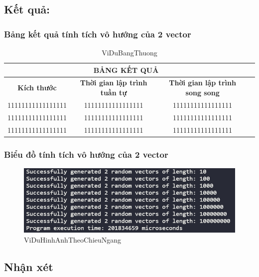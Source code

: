 \newpage
\subsection{Kết quả:}
\subsubsection{Bảng kết quả tính tích vô hướng của 2 vector}


 
 \begin{table}[h] %
 \centering
 \begin{tabular}{|c|c|c|c|}

 \hline
 \multicolumn{3}{|c|}{\textbf{BẢNG KẾT QUẢ}} \\ 
 \hline
 \textbf{Kích thước} & \textbf{Thời gian lập trình tuần tự} & \textbf{Thời gian lập trình song song} \\ \hline
 11111111111111111 & 11111111111111111 & 11111111111111111 \\ \hline
 11111111111111111 & 11111111111111111 & 11111111111111111 \\ \hline
 11111111111111111 & 11111111111111111 & 11111111111111111 \\ \hline
 \end{tabular}

 \caption{ViDuBangThuong} %
 \label{table:nghia123} %
 \end{table} 



\subsubsection{Biểu đồ tính tích vô hướng của 2 vector}


 
\begin{figure}[h] %
\centering
\includegraphics[width=1\textwidth]{pictures/image.png} %
\caption{ViDuHinhAnhTheoChieuNgang} %
\label{pictures:nghia1} %
\end{figure} 






\subsection{Nhận xét}
\lipsum[1]